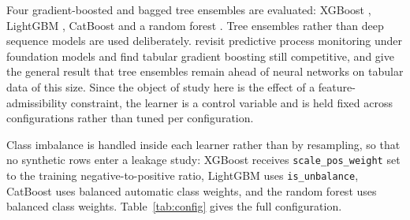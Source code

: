 Four gradient-boosted and bagged tree ensembles are evaluated: XGBoost
\citep{chen2016xgboost}, LightGBM \citep{ke2017lightgbm}, CatBoost
\citep{prokhorenkova2018catboost} and a random forest \citep{breiman2001random}. Tree ensembles
rather than deep sequence models are used deliberately.
\citet{fertig2026revisiting} revisit predictive process monitoring under foundation models and
find tabular gradient boosting still competitive, and \citet{grinsztajn2022why} give the
general result that tree ensembles remain ahead of neural networks on tabular data of this
size. Since the object of study here is the effect of a feature-admissibility constraint, the
learner is a control variable and is held fixed across configurations rather than tuned per
configuration.

Class imbalance is handled inside each learner rather than by resampling, so that no synthetic
rows enter a leakage study: XGBoost receives \texttt{scale\_pos\_weight} set to the training
negative-to-positive ratio, LightGBM uses \texttt{is\_unbalance}, CatBoost uses balanced
automatic class weights, and the random forest uses balanced class weights.
Table~\ref{tab:config} gives the full configuration.

